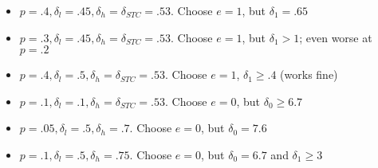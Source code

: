 \documentclass[12pt]{article}
\newcommand{\de}{\delta}
\begin{document}
\begin{itemize}
\begin{itemize}
\begin{itemize}
					\item $p=.4, \de_l = .45, \de_h = \de_{STC} = .53$. Choose $e=1$, but $\de_1 = .65$
					\item $p=.3, \de_l = .45, \de_h = \de_{STC}  = .53$. Choose $e=1$, but $\de_1 > 1$; even worse at $p=.2$
					\item $p=.4, \de_l = .5, \de_h = \de_{STC} = .53$. Choose $e=1$, $\de_1 \geq .4$ (works fine)
					\item $p=.1, \de_l = .1, \de_h = \de_{STC} = .53$. Choose $e=0$, but $\de_0 \geq 6.7$
					\item $p=.05, \de_l = .5, \de_h = .7$. Choose $e=0$, but $\de_0 = 7.6$
					\item $p=.1, \de_l = .5, \de_h = .75$. Choose $e=0$, but $\de_0 = 6.7$ and $\de_1 \geq 3$
				\end{itemize}
		\end{itemize}

\end{itemize}
\end{document}

